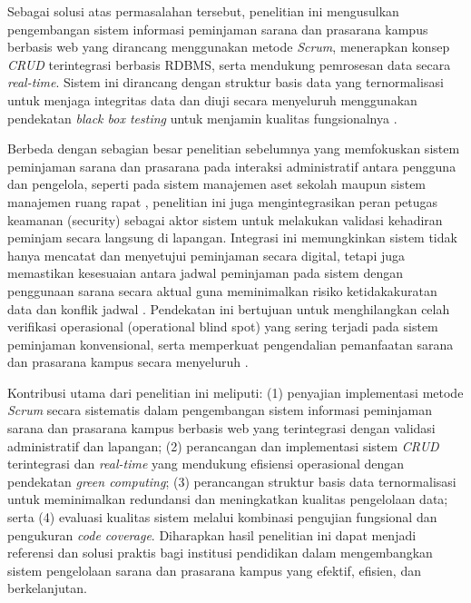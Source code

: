 \newpage

Sebagai solusi atas permasalahan tersebut, penelitian ini mengusulkan pengembangan sistem informasi peminjaman sarana dan prasarana kampus berbasis web yang dirancang menggunakan metode \textit{Scrum}, menerapkan konsep \textit{CRUD} terintegrasi berbasis RDBMS, serta mendukung pemrosesan data secara \textit{real-time}. Sistem ini dirancang dengan struktur basis data yang ternormalisasi untuk menjaga integritas data dan diuji secara menyeluruh menggunakan pendekatan \textit{black box testing} untuk menjamin kualitas fungsionalnya \parencite{PutriNabella2025}.

Berbeda dengan sebagian besar penelitian sebelumnya yang memfokuskan sistem peminjaman sarana dan prasarana pada interaksi administratif antara pengguna dan pengelola, seperti pada sistem manajemen aset sekolah \parencite{PutriNabella2025} maupun sistem manajemen ruang rapat \parencite{Herlambang2020}, penelitian ini juga mengintegrasikan peran petugas keamanan (security) sebagai aktor sistem untuk melakukan validasi kehadiran peminjam secara langsung di lapangan. Integrasi ini memungkinkan sistem tidak hanya mencatat dan menyetujui peminjaman secara digital, tetapi juga memastikan kesesuaian antara jadwal peminjaman pada sistem dengan penggunaan sarana secara aktual guna meminimalkan risiko ketidakakuratan data dan konflik jadwal \parencite{Purwati2022}. Pendekatan ini bertujuan untuk menghilangkan celah verifikasi operasional (operational blind spot) yang sering terjadi pada sistem peminjaman konvensional, serta memperkuat pengendalian pemanfaatan sarana dan prasarana kampus secara menyeluruh \parencite{Ramdany2024}.

Kontribusi utama dari penelitian ini meliputi: (1) penyajian implementasi metode \textit{Scrum} secara sistematis dalam pengembangan sistem informasi peminjaman sarana dan prasarana kampus berbasis web yang terintegrasi dengan validasi administratif dan lapangan; (2) perancangan dan implementasi sistem \textit{CRUD} terintegrasi dan \textit{real-time} yang mendukung efisiensi operasional dengan pendekatan \textit{green computing}; (3) perancangan struktur basis data ternormalisasi untuk meminimalkan redundansi dan meningkatkan kualitas pengelolaan data; serta (4) evaluasi kualitas sistem melalui kombinasi pengujian fungsional dan pengukuran \textit{code coverage}. Diharapkan hasil penelitian ini dapat menjadi referensi dan solusi praktis bagi institusi pendidikan dalam mengembangkan sistem pengelolaan sarana dan prasarana kampus yang efektif, efisien, dan berkelanjutan.

